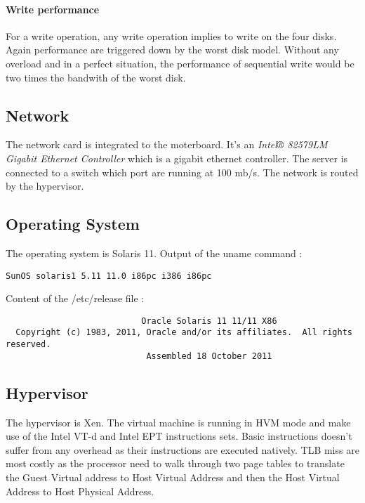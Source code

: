 \paragraph{Write performance}
For a write operation, any write operation implies to write on the four disks.
Again performance are triggered down by the worst disk model.
Without any overload and in a perfect situation, the performance of sequential
write would be two times the bandwith of the worst disk.


\subsection{Network}
The network card is integrated to the moterboard. It's an \emph{Intel® 82579LM Gigabit
Ethernet Controller} which is a gigabit ethernet controller.
The server is connected to a switch which port are running at 100 mb/s.
The network is routed by the hypervisor.

\subsection{Operating System}
The operating system is Solaris 11.
Output of the uname command :
\begin{verbatim}
SunOS solaris1 5.11 11.0 i86pc i386 i86pc
\end{verbatim}
Content of the /etc/release file :
\begin{verbatim}
                           Oracle Solaris 11 11/11 X86
  Copyright (c) 1983, 2011, Oracle and/or its affiliates.  All rights reserved.
                            Assembled 18 October 2011
\end{verbatim}

\subsection{Hypervisor}
The hypervisor is Xen.
The virtual machine is running in HVM mode and make use of the Intel VT-d and
Intel EPT instructions sets.
Basic instructions doesn't suffer from any overhead as their instructions are
executed natively.
TLB miss are most costly as the processor need to walk through two page tables
to translate the Guest Virtual address to Host Virtual Address and then the Host
Virtual Address to Host Physical Address.
